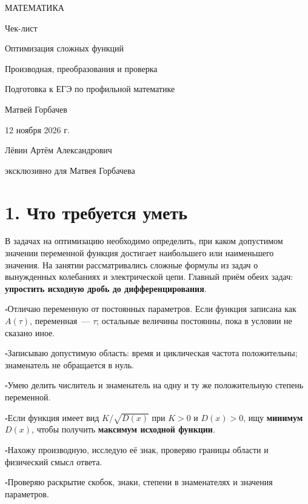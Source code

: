 \documentclass[a4paper,12pt]{article}
\newcommand{\key}[1]{\textcolor{darkaccent}{\textbf{#1}}}
\newcommand{\checkit}[1]{\par\noindent$\square$\enspace #1\par}
\begin{document}
\thispagestyle{empty}
\begin{center}
\vspace*{27mm}
{\large\textcolor{darkaccent}{МАТЕМАТИКА}}\par
\vspace{15mm}
{\huge Чек-лист}\par
\vspace{14mm}
{\LARGE\textcolor{accent}{Оптимизация сложных функций}}\par
\vspace{3mm}
{\Large\textcolor{accent}{Производная, преобразования и проверка}}\par
\vspace{20mm}
{\normalsize Подготовка к ЕГЭ по профильной математике}\par
\vfill
{\large Матвей Горбачев}\par
\vspace{12mm}
{\normalsize 12 ноября 2026 г.}\par
\vspace{13mm}
{\small Лёвин Артём Александрович}\par
{\small эксклюзивно для Матвея Горбачева}\par
\vspace{19mm}
\vspace{4mm}
\end{center}
\clearpage

\section*{1. Что требуется уметь}
В задачах на оптимизацию необходимо определить, при каком допустимом значении переменной функция достигает наибольшего или наименьшего значения. На занятии рассматривались сложные формулы из задач о вынужденных колебаниях и электрической цепи. Главный приём обеих задач: \key{упростить исходную дробь до дифференцирования}.

\checkit{Отличаю переменную от постоянных параметров. Если функция записана как $A(\tau)$, переменная~--- $\tau$; остальные величины постоянны, пока в условии не сказано иное.}
\checkit{Записываю допустимую область: время и циклическая частота положительны; знаменатель не обращается в нуль.}
\checkit{Умею делить числитель и знаменатель на одну и ту же положительную степень переменной.}
\checkit{Если функция имеет вид $K/\sqrt{D(x)}$ при $K>0$ и $D(x)>0$, ищу \textbf{минимум $D(x)$}, чтобы получить \textbf{максимум исходной функции}.}
\checkit{Нахожу производную, исследую её знак, проверяю границы области и физический смысл ответа.}
\checkit{Проверяю раскрытие скобок, знаки, степени в знаменателях и значения параметров.}
\end{document}

